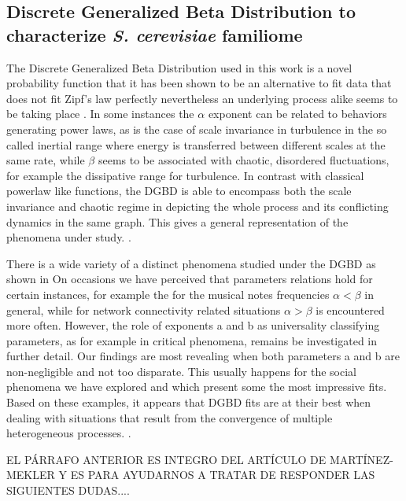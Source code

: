 \documentclass[preprint,12pt]{elsarticle}
\begin{document}
\bigbreak

\subsection{Discrete Generalized Beta Distribution to characterize {\it S. cerevisiae} familiome}
The Discrete Generalized Beta Distribution used in this work is 
a novel probability function that it has been shown to be an
alternative to fit data that does not fit Zipf's law perfectly
nevertheless an underlying process alike seems to be taking 
place \cite{martinez2009universality, fontanelli2016beyondzipf}. 
In some instances the $\alpha$ exponent can be related 
to behaviors generating power laws, as is the case of scale 
invariance in turbulence in the so called 
inertial range where energy is transferred between different 
scales at the same rate, while $\beta$ seems to be associated 
with chaotic, disordered fluctuations, for example the 
dissipative range for turbulence. 
In contrast with classical powerlaw like functions, the DGBD is
able to encompass both the scale invariance and chaotic regime in
depicting the whole process and its conflicting dynamics in the 
same graph. This gives a general representation of the phenomena
under study. \cite{martinez2009universality}.\par
 
There is a wide variety of a distinct phenomena studied under 
the DGBD as shown in \cite{martinez2009universality}
On occasions we have perceived that parameters relations hold for 
certain instances, for example the for the musical notes 
frequencies $\alpha < \beta$ in general, while for network 
connectivity related situations $\alpha > \beta $ 
is encountered more often. However, the role of exponents a and b 
as universality classifying parameters, as for example in critical 
phenomena, remains be investigated in further detail. 
Our findings are most revealing when both parameters a and b are 
non-negligible and not too disparate. This usually happens for the 
social phenomena we have explored and which present some the most 
impressive fits. Based on these examples, it appears that DGBD fits 
are at their best when dealing with situations that result from the 
convergence of multiple heterogeneous processes. \cite{martinez2009universality}. \par 

EL PÁRRAFO ANTERIOR ES INTEGRO DEL ARTÍCULO DE MARTÍNEZ-MEKLER Y ES 
PARA AYUDARNOS A TRATAR DE RESPONDER LAS SIGUIENTES DUDAS.... \par 
\end{document}
